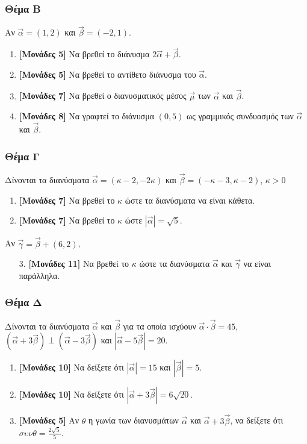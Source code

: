 \documentclass[12pt]{article}
\begin{document}
\section*{Θέμα Β}
\noindent
Αν $\vec{α}=(1,2)$ και $\vec{β}=(-2,1)$.
\begin{enumerate}
  \item \textbf{[Μονάδες 5]} Να βρεθεί το διάνυσμα $2\vec{α}+\vec{β}$.
  \item \textbf{[Μονάδες 5]} Να βρεθεί το αντίθετο διάνυσμα του $\vec{α}$.
  \item \textbf{[Μονάδες 7]} Να βρεθεί ο διανυσματικός μέσος $\vec{μ}$ των $\vec{α}$ και $\vec{β}$.
  \item \textbf{[Μονάδες 8]} Να γραφτεί το διάνυσμα $(0,5)$ ως γραμμικός συνδυασμός των $\vec{α}$ και $\vec{β}$.
\end{enumerate}

\section*{Θέμα Γ}
\noindent
Δίνονται τα διανύσματα $\vec{α}=(κ-2,-2κ)$ και $\vec{β}=(-κ-3,κ-2)$, $κ>0$
\begin{enumerate}
  \item \textbf{[Μονάδες 7]} Να βρεθεί το $κ$ ώστε τα διανύσματα να είναι κάθετα.
  \item \textbf{[Μονάδες 7]} Να βρεθεί το $κ$ ώστε $|\vec{α}|=\sqrt{5}$.
\end{enumerate}
Αν $\vec{γ}=\vec{β}+(6,2)$,
\begin{enumerate}
  \item[3.] \textbf{[Μονάδες 11]} Να βρεθεί το $κ$ ώστε τα διανύσματα $\vec{α}$ και $\vec{γ}$ να είναι παράλληλα.
\end{enumerate}

\section*{Θέμα Δ}
\noindent
Δίνονται τα διανύσματα $\vec{α}$ και $\vec{β}$ για τα οποία ισχύουν $\vec{α}\cdot\vec{β}=45$, $\left(\vec{α}+3\vec{β}\right)\perp\left(\vec{α}-3\vec{β}\right)$ και $|\vec{α}-5\vec{β}|=20$.
\begin{enumerate}
  \item \textbf{[Μονάδες 10]} Να δείξετε ότι $|\vec{α}|=15$ και $|\vec{β}|=5$.
  \item \textbf{[Μονάδες 10]} Να δείξετε ότι $|\vec{α}+3\vec{β}|=6\sqrt{20}$.
  \item \textbf{[Μονάδες 5]} Αν $θ$ η γωνία των διανυσμάτων $\vec{α}$ και $\vec{α}+3\vec{β}$, να δείξετε ότι $συνθ=\frac{2\sqrt{5}}{5}$.
\end{enumerate}

\vspace{3\baselineskip}

\part*{}
\end{document}
